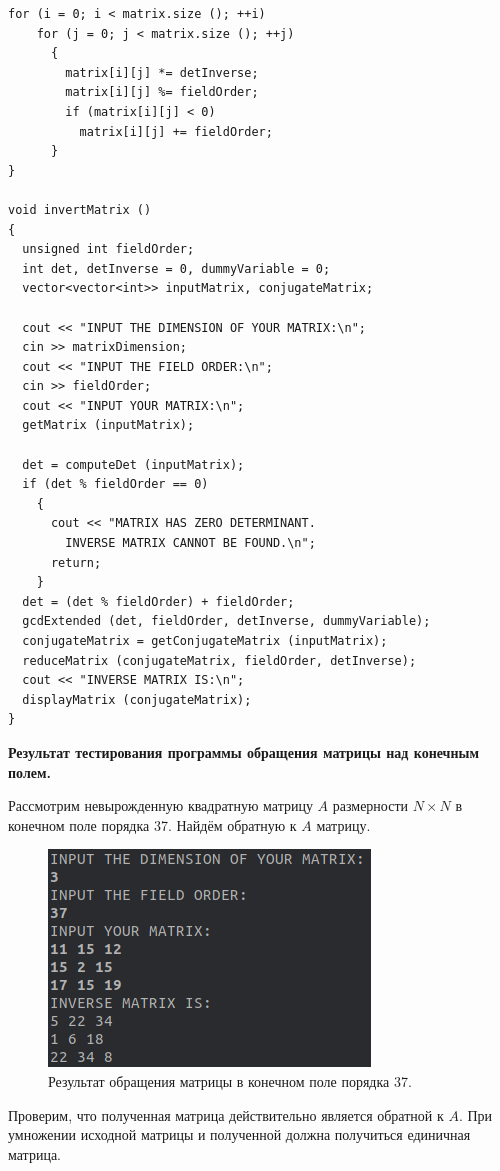 \documentclass[spec, och, otchet, hidelinks]{SCWorks}
\newcommand{\tbf}[1]{\textbf{#1}}
\begin{document}
\begin{lstlisting}[caption=Код программы., mathescape]
  for (i = 0; i < matrix.size (); ++i)
    for (j = 0; j < matrix.size (); ++j)
      {
        matrix[i][j] *= detInverse;
        matrix[i][j] %= fieldOrder;
        if (matrix[i][j] < 0)
          matrix[i][j] += fieldOrder;
      }
}

void invertMatrix ()
{
  unsigned int fieldOrder;
  int det, detInverse = 0, dummyVariable = 0;
  vector<vector<int>> inputMatrix, conjugateMatrix;

  cout << "INPUT THE DIMENSION OF YOUR MATRIX:\n";
  cin >> matrixDimension;
  cout << "INPUT THE FIELD ORDER:\n";
  cin >> fieldOrder;
  cout << "INPUT YOUR MATRIX:\n";
  getMatrix (inputMatrix);

  det = computeDet (inputMatrix);
  if (det % fieldOrder == 0)
    {
      cout << "MATRIX HAS ZERO DETERMINANT.
        INVERSE MATRIX CANNOT BE FOUND.\n";
      return;
    }
  det = (det % fieldOrder) + fieldOrder;
  gcdExtended (det, fieldOrder, detInverse, dummyVariable);
  conjugateMatrix = getConjugateMatrix (inputMatrix);
  reduceMatrix (conjugateMatrix, fieldOrder, detInverse);
  cout << "INVERSE MATRIX IS:\n";
  displayMatrix (conjugateMatrix);
}
\end{lstlisting}

\par \tbf{Результат тестирования программы обращения матрицы над конечным
  полем.}
\par Рассмотрим невырожденную квадратную матрицу $A$ размерности $N \times N$ в
конечном поле порядка 37. Найдём обратную к $A$ матрицу.

\begin{figure}[h!]
  \center\includegraphics[scale=0.6]{matrix_field_inverse.png}
  \caption{Результат обращения матрицы в конечном поле порядка 37.}
\end{figure}

\par Проверим, что полученная матрица действительно является обратной к $A$. При
умножении исходной матрицы и полученной должна получиться единичная матрица.
\end{document}
